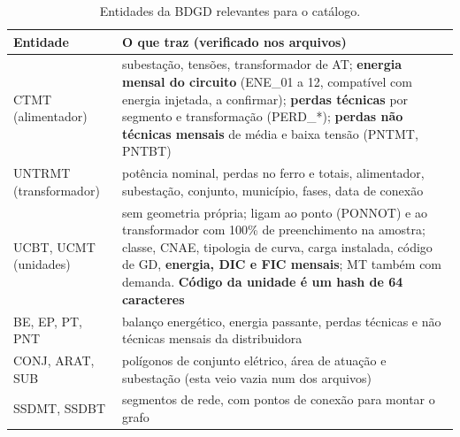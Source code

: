 \begin{table}[H]
\centering\small
\caption{Entidades da BDGD relevantes para o catálogo.}
\begin{tabularx}{\textwidth}{P{3.2cm} L}
\toprule
\textbf{Entidade} & \textbf{O que traz (verificado nos arquivos)} \\
\midrule
CTMT (alimentador) & subestação, tensões, transformador de AT; \textbf{energia mensal do circuito} (ENE\_01 a 12, compatível com energia injetada, a confirmar); \textbf{perdas técnicas} por segmento e transformação (PERD\_*); \textbf{perdas não técnicas mensais} de média e baixa tensão (PNTMT, PNTBT) \\
UNTRMT (transformador) & potência nominal, perdas no ferro e totais, alimentador, subestação, conjunto, município, fases, data de conexão \\
UCBT, UCMT (unidades) & sem geometria própria; ligam ao ponto (PONNOT) e ao transformador com 100\% de preenchimento na amostra; classe, CNAE, tipologia de curva, carga instalada, código de GD, \textbf{energia, DIC e FIC mensais}; MT também com demanda. \textbf{Código da unidade é um hash de 64 caracteres} \\
BE, EP, PT, PNT & balanço energético, energia passante, perdas técnicas e não técnicas mensais da distribuidora \\
CONJ, ARAT, SUB & polígonos de conjunto elétrico, área de atuação e subestação (esta veio vazia num dos arquivos) \\
SSDMT, SSDBT & segmentos de rede, com pontos de conexão para montar o grafo \\
\bottomrule
\end{tabularx}
\end{table}

